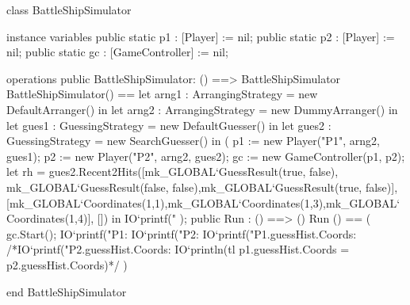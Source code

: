 \documentclass[a4paper]{article}
\begin{document}
\title{}
\author{}
\begin{vdm_al}
class BattleShipSimulator

instance variables
    public static p1 : [Player] := nil;
    public static p2 : [Player] := nil;
    public static gc : [GameController] := nil;

operations
public BattleShipSimulator: () ==> BattleShipSimulator
    BattleShipSimulator() == 
        let arng1 : ArrangingStrategy = new DefaultArranger() in
        let arng2 : ArrangingStrategy = new DummyArranger() in
        let gues1 : GuessingStrategy = new DefaultGuesser() in
        let gues2 : GuessingStrategy = new SearchGuesser()
        in (
           p1 := new Player("P1", arng2, gues1);
           p2 := new Player("P2", arng2, gues2);
           gc := new GameController(p1, p2);
           let rh = gues2.Recent2Hits([mk_GLOBAL`GuessResult(true, false), mk_GLOBAL`GuessResult(false, false),mk_GLOBAL`GuessResult(true, false)],
           [mk_GLOBAL`Coordinates(1,1),mk_GLOBAL`Coordinates(1,3),mk_GLOBAL`Coordinates(1,4)], []) in IO`printf("%
           );
public Run : () ==> ()
Run () == (
        gc.Start();
        IO`printf("P1: %
        IO`printf("P2: %
        IO`printf("P1.guessHist.Coords: %
        /*IO`printf("P2.guessHist.Coords: %
        IO`println(tl p1.guessHist.Coords = p2.guessHist.Coords)*/
        )

end BattleShipSimulator
\end{vdm_al}
\end{document}
